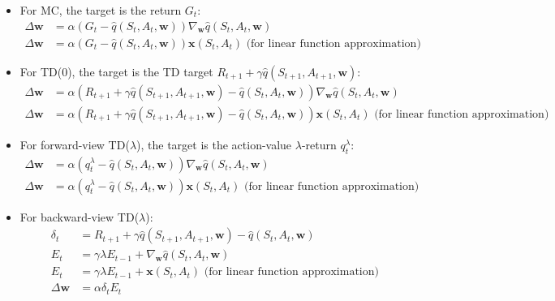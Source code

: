 \begin{itemize}
    \item For MC, the target is the return $G_t$:
          \begin{align*}
              \Delta \mathbf{w} & = \alpha (G_t - \hat{q}(S_t, A_t, \mathbf{w})) \nabla_\mathbf{w} \hat{q}(S_t, A_t, \mathbf{w})                  \\
              \Delta \mathbf{w} & = \alpha (G_t - \hat{q}(S_t, A_t, \mathbf{w})) \mathbf{x}(S_t, A_t) \text{ (for linear function approximation)}
          \end{align*}
    \item For TD(0), the target is the TD target $R_{t+1} + \gamma \hat{q}(S_{t+1},
              A_{t+1}, \mathbf{w})$:
          \begin{align*}
              \Delta \mathbf{w} & = \alpha (R_{t+1} + \gamma \hat{q}(S_{t+1}, A_{t+1}, \mathbf{w}) - \hat{q}(S_t, A_t, \mathbf{w})) \nabla_\mathbf{w} \hat{q}(S_t, A_t, \mathbf{w})                  \\
              \Delta \mathbf{w} & = \alpha (R_{t+1} + \gamma \hat{q}(S_{t+1}, A_{t+1}, \mathbf{w}) - \hat{q}(S_t, A_t, \mathbf{w})) \mathbf{x}(S_t, A_t) \text{ (for linear function approximation)}
          \end{align*}
    \item For forward-view TD($\lambda$), the target is the action-value $\lambda$-return
          $q_t^\lambda$:
          \begin{align*}
              \Delta \mathbf{w} & = \alpha (q_t^\lambda - \hat{q}(S_t, A_t, \mathbf{w})) \nabla_\mathbf{w} \hat{q}(S_t, A_t, \mathbf{w})                  \\
              \Delta \mathbf{w} & = \alpha (q_t^\lambda - \hat{q}(S_t, A_t, \mathbf{w})) \mathbf{x}(S_t, A_t) \text{ (for linear function approximation)}
          \end{align*}
    \item For backward-view TD($\lambda$):
          \begin{align*}
              \delta_t          & = R_{t+1} + \gamma \hat{q}(S_{t+1}, A_{t+1}, \mathbf{w}) - \hat{q}(S_t, A_t, \mathbf{w})    \\
              E_t               & = \gamma \lambda E_{t-1} + \nabla_\mathbf{w} \hat{q}(S_t, A_t, \mathbf{w})                  \\
              E_t               & = \gamma \lambda E_{t-1} + \mathbf{x}(S_t, A_t) \text{ (for linear function approximation)} \\
              \Delta \mathbf{w} & = \alpha \delta_t E_t
          \end{align*}
\end{itemize}

